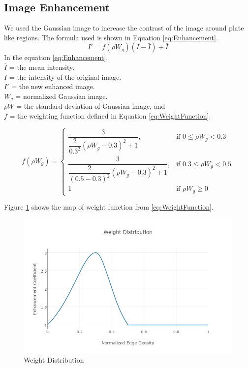 \documentclass{standalone}
\begin{document}
\subsection{Image Enhancement}
We used the Gaussian image to increase the contrast of the image around plate like regions. The formula used is shown in Equation \ref{eq:Enhancement}.
\begin{equation} \label{eq:Enhancement}
I' = f(\rho W_g) (I - \bar{I}) + \bar{I}
\end{equation}
In the equation \ref{eq:Enhancement},\\
$\bar{I}$ = the mean intensity. \\
$I$ = the intensity of the original image. \\
$I'$ = the new enhanced image. \\
$W_g$ = normalized Gaussian image. \\ 
$\rho W$ = the standard deviation of Gaussian image, and \\
$f$ = the weighting function defined in Equation \ref{eq:WeightFunction}.

\begin{equation} \label{eq:WeightFunction}
f(\rho W_g) = 
\begin{cases} 
	\dfrac{3}{ \dfrac{2}{0.3^2} ( \rho W_g - 0.3)^2 + 1 },
    	& \mbox{if } 0 \leq \rho W_g < 0.3  
     \\
    
    \dfrac{3}{ \dfrac{2}{(0.5 - 0.3)^2} ( \rho W_g - 0.3)^2 + 1 },
    	& \mbox{if } 0.3 \leq \rho W_g < 0.5  
     \\
        
    1	& \mbox{if } \rho W_g \geq 0
\end{cases}
\end{equation} 

Figure \ref{fig:WeightDistribution} shows the map of weight function from \ref{eq:WeightFunction}.

\begin{figure}
	\centering
	\includegraphics[width=.8\linewidth]{./img/plots/weight.png}
	\caption{Weight Distribution} 
	\label{fig:WeightDistribution}
\end{figure}
\end{document}
